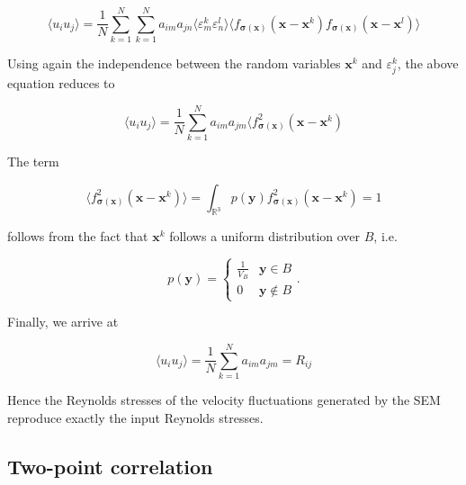 \begin{equation}
\langle u_i u_j \rangle = \frac{1}{N}\sum_{k=1}^N\sum_{k=1}^N a_{im}a_{jn} \langle \varepsilon_m^k \varepsilon_n^l \rangle \langle f_{\boldsymbol{\sigma}(\boldsymbol{x})}(\boldsymbol{x}-\boldsymbol{x}^k) f_{\boldsymbol{\sigma}(\boldsymbol{x})}(\boldsymbol{x}-\boldsymbol{x}^l) \rangle
\end{equation}

\noindent Using again the independence between the random variables $\boldsymbol{x}^k$ and $\varepsilon_j^k$, the above equation reduces to

\begin{equation}
\langle u_i u_j \rangle = \frac{1}{N}\sum_{k=1}^N a_{im}a_{jm} \langle f_{\boldsymbol{\sigma}(\boldsymbol{x})}^2(\boldsymbol{x}-\boldsymbol{x}^k)
\end{equation}

\noindent The term

\begin{equation}
\langle f_{\boldsymbol{\sigma}(\boldsymbol{x})}^2(\boldsymbol{x}-\boldsymbol{x}^k) \rangle = \int_{\mathbb{R}^3} p(\boldsymbol{y}) f_{\boldsymbol{\sigma}(\boldsymbol{x})}^2(\boldsymbol{x}-\boldsymbol{x}^k) = 1
\end{equation}

\noindent follows from the fact that $\boldsymbol{x}^k$ follows a uniform distribution over $B$, i.e. 

\begin{equation} \label{distribution}
p(\boldsymbol{y}) = 
\begin{cases}
\frac{1}{V_B} & \boldsymbol{y} \in B \\
0 & \boldsymbol{y} \notin B
\end{cases}.
\end{equation}

\noindent Finally, we arrive at

\begin{equation} \label{ReynoldsStresses}
\langle u_i u_j \rangle = \frac{1}{N}\sum_{k=1}^N a_{im}a_{jm} = R_{ij}
\end{equation}

\noindent Hence the Reynolds stresses of the velocity fluctuations generated by the SEM reproduce exactly the input Reynolds stresses.

\subsection{Two-point correlation}

